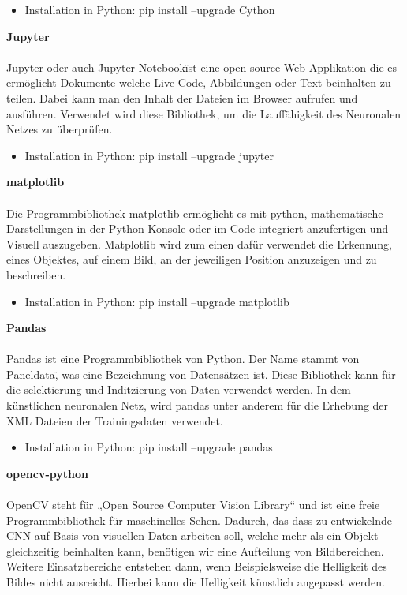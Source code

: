 \documentclass[a4paper,12pt,oneside]{article}
\begin{document}
  \begin{itemize}
\item Installation in Python: pip install --upgrade Cython
  \end{itemize}

\textbf{Jupyter}\\\\
Jupyter oder auch \"Jupyter Notebook\" ist eine open-source Web Applikation die es ermöglicht Dokumente welche Live Code, Abbildungen oder Text beinhalten zu teilen. Dabei kann man den Inhalt der Dateien im Browser aufrufen und ausführen. Verwendet wird diese Bibliothek, um die Lauffähigkeit des Neuronalen Netzes zu überprüfen.  

\begin{itemize}
\item Installation in Python: pip install --upgrade jupyter
  \end{itemize}
  
\textbf{matplotlib}\\\\
Die Programmbibliothek matplotlib ermöglicht es mit python, mathematische Darstellungen in der Python-Konsole oder im Code integriert anzufertigen und Visuell auszugeben.
Matplotlib wird zum einen dafür verwendet die Erkennung, eines Objektes, auf einem Bild, an der jeweiligen Position anzuzeigen und zu beschreiben.

  \begin{itemize}
\item Installation in Python: pip install --upgrade matplotlib
  \end{itemize}
  
\textbf{Pandas}\\\\
Pandas ist eine Programmbibliothek von Python. Der Name stammt von \"Paneldata\", was eine Bezeichnung von Datensätzen ist. Diese Bibliothek kann für die selektierung und Inditzierung von Daten verwendet werden. In dem künstlichen neuronalen Netz, wird pandas unter anderem für die Erhebung der XML Dateien der Trainingsdaten verwendet.

  \begin{itemize}
\item Installation in Python: pip install --upgrade pandas
  \end{itemize}
  
\textbf{opencv-python}\\\\
OpenCV steht für „Open Source Computer Vision Library“ und ist eine freie Programmbibliothek für maschinelles Sehen. Dadurch, das dass zu entwickelnde CNN auf Basis von visuellen Daten arbeiten soll, welche mehr als ein Objekt gleichzeitig beinhalten kann, benötigen wir eine Aufteilung von Bildbereichen. Weitere Einsatzbereiche entstehen dann, wenn Beispielsweise die Helligkeit des Bildes nicht ausreicht. Hierbei kann die Helligkeit künstlich angepasst werden.
\end{document}
